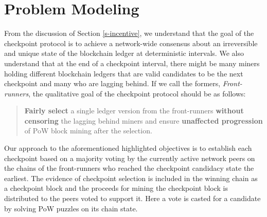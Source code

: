 
\section{Problem Modeling}
\label{s-model}
From the discussion of Section \ref{s-incentive}, we understand that the goal of the checkpoint protocol is to achieve a network-wide consensus about an irreversible and unique state of the blockchain ledger at deterministic intervals. We also understand that at the end of a checkpoint interval, there might be many miners holding different blockchain ledgers that are valid candidates to be the next checkpoint and many who are lagging behind. If we call the formers, \textit{Front-runners}, the qualitative goal of the checkpoint protocol should be as follows:

\begin{quote}
\textbf{Fairly select} a single ledger version from the front-runners \textbf{without censoring} the lagging behind miners and ensure \textbf{unaffected progression} of PoW block mining after the selection.  
\end{quote}

Our approach to the aforementioned highlighted objectives is to establish each checkpoint based on a majority voting by the currently active network peers on the chains of the front-runners who reached the checkpoint candidacy state the earliest. The evidence of checkpoint selection is included in the winning chain as a checkpoint block and the proceeds for mining the checkpoint block is distributed to the peers voted to support it. Here a vote is casted for a candidate by solving PoW puzzles on its chain state.

